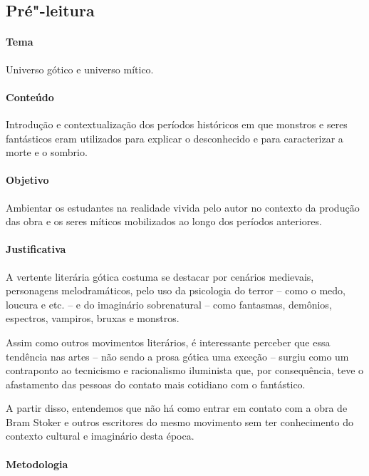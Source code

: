 \documentclass[12pt]{extarticle}
\begin{document}
\subsection{Pré"-leitura} 

\paragraph{Tema} Universo gótico e universo mítico.

\paragraph{Conteúdo} Introdução e contextualização dos períodos históricos
em que monstros e seres fantásticos eram utilizados para explicar o desconhecido e 
para caracterizar a morte e o sombrio. 

\paragraph{Objetivo} Ambientar os estudantes na realidade vivida pelo autor no contexto 
da produção das obra e os seres míticos mobilizados ao longo dos períodos anteriores. 

\paragraph{Justificativa} A vertente literária gótica costuma se destacar por cenários medievais,
personagens melodramáticos, pelo uso da psicologia do terror -- como o medo,
loucura e etc. -- e do imaginário sobrenatural -- como fantasmas,
demônios, espectros, vampiros, bruxas e monstros.

Assim como outros movimentos literários, é interessante perceber que essa tendência nas artes -- não 
sendo a prosa gótica uma exceção -- surgiu como um contraponto ao tecnicismo e racionalismo iluminista 
que, por consequência, teve o afastamento das pessoas do contato mais cotidiano com o fantástico. 

A partir disso, entendemos que não há como entrar em contato com a obra de Bram Stoker e outros escritores 
do mesmo movimento sem ter conhecimento do contexto cultural e imaginário desta época.

\paragraph{Metodologia}
\end{document}
